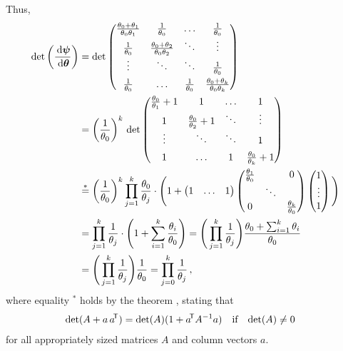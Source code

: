 Thus,
\begin{align*}
\det\left(\frac{\,\mathrm{d}\boldsymbol{\psi}}{\,\mathrm{d}\boldsymbol{\theta}}\right)
&= \det \begin{pmatrix}\frac{\theta_0 + \theta_1}{\theta_0 \theta_1} & \frac{1}{\theta_0} & \hdots & \frac{1}{\theta_0} \\
                       \frac{1}{\theta_0} & \frac{\theta_0 + \theta_2}{\theta_0 \theta_2} & \ddots & \vdots \\
                       \vdots & \ddots & \ddots & \frac{1}{\theta_0} \\[1ex]
                       \frac{1}{\theta_0} & \hdots & \frac{1}{\theta_0} & \frac{\theta_0 + \theta_k}{\theta_0 \theta_k}
        \end{pmatrix} \\
&= \left(\frac{1}{\theta_0}\right)^k\, \det
        \begin{pmatrix}\frac{\theta_0}{\theta_1} + 1 & 1 & \hdots & 1 \\
                       1 & \frac{\theta_0 }{\theta_2} + 1 & \ddots & \vdots \\
                       \vdots & \ddots & \ddots & 1 \\[1ex]
                       1 & \hdots & 1 & \frac{\theta_0}{\theta_k} + 1
        \end{pmatrix} \\
&\stackrel{*}{=} \left(\frac{1}{\theta_0}\right)^k \prod_{j=1}^k \frac{\theta_0}{\theta_j}
                 \cdot \Bigg( 1 + \begin{pmatrix}1 & \hdots & 1\end{pmatrix}
                                  \begin{pmatrix}\frac{\theta_1}{\theta_0} &  & 0 \\
                                                  & \ddots & \\
                                                 0 & & \frac{\theta_k}{\theta_0}\end{pmatrix}
                                  \begin{pmatrix}1 \\ \vdots\\ 1\end{pmatrix}\Bigg)\\
&= \prod_{j=1}^k \frac{1}{\theta_j} \cdot \Bigg( 1 + \sum_{i=1}^k \frac{\theta_i}{\theta_0} \Bigg)
 = \Bigg( \prod_{j=1}^k \frac{1}{\theta_j}\Bigg) \frac{ \theta_0 + \sum_{i=1}^k \theta_i}{\theta_0}\\
&= \Bigg( \prod_{j=1}^k \frac{1}{\theta_j}\Bigg) \frac{1}{\theta_0}
 = \prod_{j=0}^k \frac{1}{\theta_j}\,,
\end{align*}
where equality ${}^*$ holds by the theorem \cite[Theorem A 16 (x), Appendix A3, p.~494]{MR2370506},
stating that
\begin{align*}
\det (A + a\, a^{{\mbox{\!\scriptsize\textsf{T}}}}) &= \det(A) (1+a^{{\mbox{\!\scriptsize\textsf{T}}}} A^{-1} a) & \text{if}& & \det(A) &\neq 0
\end{align*}
for all appropriately sized matrices $A$ and column vectors $a$.

